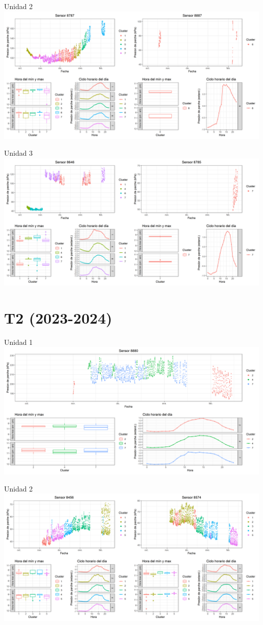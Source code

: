 \documentclass[
  letterpaper,
  DIV=11,
  numbers=noendperiod]{scrreprt}
\begin{document}
Unidad 2
\includegraphics{figuras/02_turgor_limpiado/2023_2024_La_Esperanza_T1_Unidad_2.png}

Unidad 3
\includegraphics{figuras/02_turgor_limpiado/2023_2024_La_Esperanza_T1_Unidad_3.png}

\chapter{T2 (2023-2024)}

Unidad 1
\includegraphics{figuras/02_turgor_limpiado/2023_2024_La_Esperanza_T2_Unidad_1.png}

Unidad 2
\includegraphics{figuras/02_turgor_limpiado/2023_2024_La_Esperanza_T2_Unidad_2.png}
\end{document}
